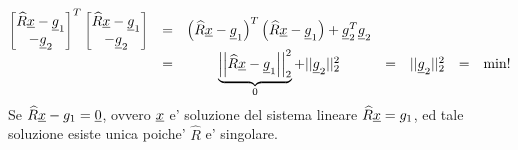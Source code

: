 \begin{enumerate}
\begin{equation*}
\begin{matrix}
			\begin{bmatrix}
				\widehat R\uline x-\uline g_1\\
				-\uline g_2
			\end{bmatrix}^T
			\begin{bmatrix}
				\widehat R\uline x-\uline g_1\\
				-\uline g_2
			\end{bmatrix}&=& \left(\widehat R\uline x-\uline g_1\right)^T\left(\widehat R\uline x-\uline g_1\right)+\uline g_2^T\uline g_2 \\
			&{=}& \underbrace{\left|\left|\widehat R\uline x - \uline g_1\right|\right|_2^2}_0+||\uline g_2||_2^2 &{=}& ||\uline g_2||_2^2&=&\min !
		\end{matrix}
	\end{equation*}
	Se $\widehat{R}\uline x - g_1 = \uline 0$, ovvero $\uline x$ e' soluzione del sistema lineare $\widehat{R}\uline x = g_1$, ed tale soluzione esiste unica poiche' $\widehat{R}$ e' singolare.
\end{enumerate}